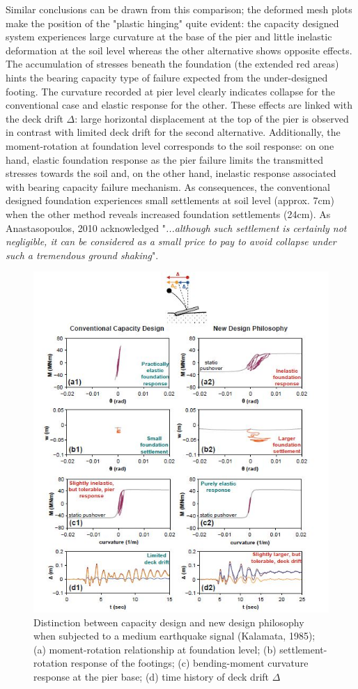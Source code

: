 \documentclass[12pt,a4paper]{report}
\begin{document}
Similar conclusions can be drawn from this comparison; the deformed mesh plots make the position of the "plastic hinging" quite evident: the capacity designed system experiences large curvature at the base of the pier and little inelastic deformation at the soil level whereas the other alternative shows opposite effects. The accumulation of stresses beneath the foundation (the extended red areas) hints the bearing capacity type of failure expected from the under-designed footing. The curvature recorded at pier level clearly indicates collapse for the conventional case and elastic response for the other. These effects are linked with the deck drift $\Delta$: large horizontal displacement at the top of the pier is observed in contrast with limited deck drift for the second alternative. Additionally, the moment-rotation at foundation level corresponds to the soil response: on one hand, elastic foundation response as the pier failure limits the transmitted stresses towards the soil and, on the other hand, inelastic response associated with bearing capacity failure mechanism. As consequences, the conventional designed foundation experiences small settlements at soil level (approx. 7cm) when the other method reveals increased foundation settlements (24cm). As Anastasopoulos, 2010 \cite{anastasopoulos2010soil} acknowledged "\textit{...although such settlement is certainly not negligible, it can be considered as a small price to pay to avoid collapse under such a tremendous ground shaking}".

\begin{figure}[!h]
	\centering
	\includegraphics[width=0.9\linewidth]{"conven2"}
	\caption{Distinction between capacity design and new design philosophy when subjected to a medium earthquake signal (Kalamata, 1985); (a) moment-rotation relationship at foundation level; (b) settlement-rotation response of the footings; (c) bending-moment curvature response at the pier base; (d) time history of deck drift $\Delta$}
	\label{conventional2}
\end{figure}
\end{document}
